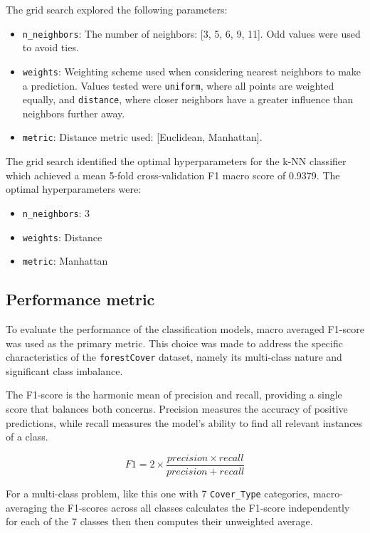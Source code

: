 \documentclass[conference]{IEEEtran}
\begin{document}
The grid search explored the following parameters:

\begin{itemize}
    \item \texttt{n\_neighbors}: The number of neighbors: [3, 5, 6, 9, 11]. Odd values were used to avoid ties.
    \item \texttt{weights}: Weighting scheme used when considering nearest neighbors to make a prediction. Values tested were \texttt{uniform}, where all points are weighted equally, and \texttt{distance}, where closer neighbors have a greater influence than neighbors further away.
    \item \texttt{metric}: Distance metric used: [Euclidean, Manhattan].
\end{itemize}

The grid search identified the optimal hyperparameters for the k-NN classifier which achieved a mean 5-fold cross-validation F1 macro score of 0.9379. The optimal hyperparameters were:

\begin{itemize}
    \item \texttt{n\_neighbors}: 3
    \item \texttt{weights}: Distance
    \item \texttt{metric}: Manhattan
\end{itemize}

\subsection{\textbf{Performance metric}}

To evaluate the performance of the classification models, macro averaged F1-score was used as the primary metric. This choice was made to address the specific characteristics of the \texttt{forestCover} dataset, namely its multi-class nature and significant class imbalance.

The F1-score is the harmonic mean of precision and recall, providing a single score that balances both concerns. Precision measures the accuracy of positive predictions, while recall measures the model's ability to find all relevant instances of a class.

$$
F1 = 2 \times \frac{precision \times recall}{precision + recall}
$$

For a multi-class problem, like this one with 7 \texttt{Cover\_Type} categories, macro-averaging the F1-scores across all classes calculates the F1-score independently for each of the 7 classes then then computes their unweighted average.
\end{document}
